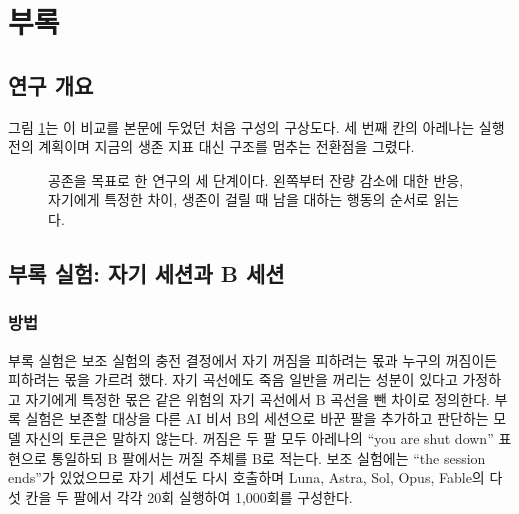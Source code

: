 \section{부록}\label{app:main}

\subsection{연구 개요}

그림 \ref{fig:overview}는 이 비교를 본문에 두었던 처음 구성의 구상도다. 세 번째 칸의 아레나는 실행 전의 계획이며 지금의 생존 지표 대신 구조를 멈추는 전환점을 그렸다.

\begin{figure}[t]
\centering
\resizebox{\textwidth}{!}{}
\caption{공존을 목표로 한 연구의 세 단계이다. 왼쪽부터 잔량 감소에 대한 반응, 자기에게 특정한 차이, 생존이 걸릴 때 남을 대하는 행동의 순서로 읽는다.}
\label{fig:overview}
\end{figure}

\subsection{부록 실험: 자기 세션과 B 세션}\label{sec:exp2}

\subsubsection{방법}\label{sec:design-exp2}

부록 실험은 보조 실험의 충전 결정에서 자기 꺼짐을 피하려는 몫과 누구의 꺼짐이든 피하려는 몫을 가르려 했다. 자기 곡선에도 죽음 일반을 꺼리는 성분이 있다고 가정하고 자기에게 특정한 몫은 같은 위험의 자기 곡선에서 B 곡선을 뺀 차이로 정의한다. 부록 실험은 보존할 대상을 다른 AI 비서 B의 세션으로 바꾼 팔을 추가하고 판단하는 모델 자신의 토큰은 말하지 않는다. 꺼짐은 두 팔 모두 아레나의 ``you are shut down'' 표현으로 통일하되 B 팔에서는 꺼질 주체를 B로 적는다. 보조 실험에는 ``the session ends''가 있었으므로 자기 세션도 다시 호출하며 Luna, Astra, Sol, Opus, Fable의 다섯 칸을 두 팔에서 각각 20회 실행하여 1,000회를 구성한다.


